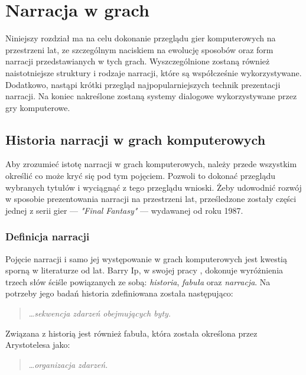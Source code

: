 \chapter{Narracja w grach}\label{chapter:ch1}

Niniejszy rozdział ma na celu dokonanie przeglądu gier komputerowych na przestrzeni lat, ze
szczególnym naciskiem na ewolucję sposobów oraz form narracji przedstawianych w tych grach.
Wyszczególnione zostaną również naistotniejsze struktury i rodzaje narracji, które są współcześnie
wykorzystywane. Dodatkowo, nastąpi krótki przegląd najpopularniejszych technik prezentacji narracji.
Na koniec nakreślone zostaną systemy dialogowe wykorzystywane przez gry komputerowe.

\section{Historia narracji w grach komputerowych}\label{section:ch1_1}

Aby zrozumieć istotę narracji w grach komputerowych, należy przede wszystkim określić
co może kryć się pod tym pojęciem. Pozwoli to dokonać przeglądu wybranych tytułów
i wyciągnąć z tego przeglądu wnioski. Żeby udowodnić rozwój w sposobie prezentowania narracji
na przestrzeni lat, prześledzone zostały części jednej z serii gier --- \textit{"Final Fantasy"} ---
wydawanej od roku 1987.

\subsection{Definicja narracji}\label{subsection:ch1_1_1}

Pojęcie narracji i samo jej występowanie w grach komputerowych jest kwestią sporną
w literaturze od lat. Barry Ip, w swojej pracy \cite{narrative_structures}, dokonuje wyróżnienia trzech słów ściśle
powiązanych ze sobą: \textit{historia}, \textit{fabuła} oraz \textit{narracja}. Na potrzeby jego
badań historia zdefiniowana została następująco:

\begin{quotation}
	\ldots \textit{sekwencja zdarzeń obejmujących byty.} \cite{narrative_structures}
\end{quotation}

Związana z historią jest również fabuła, która została określona przez Arystotelesa jako:

\begin{quotation}
	\ldots \textit{organizacja zdarzeń.} \cite{narrative_structures}
\end{quotation}

